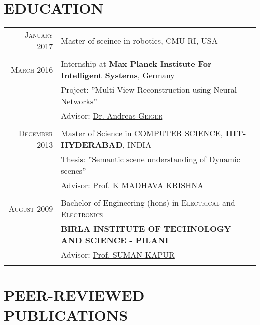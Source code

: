\documentclass[a4paper,10pt]{article}
\begin{document}
\section{EDUCATION}
\begin{tabular}{rl}	
 \textsc{January} 2017 & Master of sceince in robotics, CMU RI, USA\\
 \\

 \textsc{March} 2016 & Internship at \textbf{Max Planck Institute For Intelligent Systems}, Germany\\
& Project: ''Multi-View Reconstruction using Neural Networks'' \\
&\small Advisor: \href{http://www.cvlibs.net/} {Dr. Andreas \textsc{Geiger}} \\&\\

 \textsc{December} 2013 & Master of Science in \textsc{COMPUTER SCIENCE}, \textbf{IIIT-HYDERABAD}, INDIA\\
& Thesis: ''Semantic scene understanding of Dynamic scenes'' \\
&\normalsize  \small Advisor: \href{https://www.iiit.ac.in/people/faculty/mkrishna/} {Prof. K MADHAVA \textsc{KRISHNA}} \\&\\

\textsc{August} 2009& Bachelor of Engineering (hons) in \textsc{Electrical} and \textsc{Electronics} \\ & \normalsize\textbf{BIRLA INSTITUTE OF TECHNOLOGY AND SCIENCE - PILANI}\\
&\normalsize \small Advisor: \href{http://www.bits-pilani.ac.in/Hyderabad/sumankapur/Profile} {Prof. SUMAN \textsc{KAPUR}}\\&\\

\end{tabular}

\section{PEER-REVIEWED PUBLICATIONS} 

\end{document}
